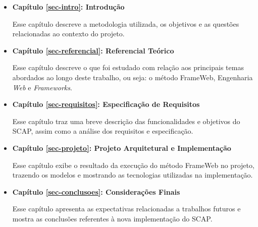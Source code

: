 \begin{itemize}

\item \textbf{Capítulo \ref{sec-intro}: Introdução}

Esse capítulo descreve a metodologia utilizada, os objetivos e as questões relacionadas ao contexto do projeto. 

\item \textbf{Capítulo \ref{sec-referencial}: Referencial Teórico}

Esse capítulo descreve o que foi estudado com relação aos principais temas abordados ao longo deste trabalho, ou seja: o método FrameWeb, Engenharia \textit{Web} e \textit{Frameworks}.

\item \textbf{Capítulo \ref{sec-requisitos}: Especificação de Requisitos}

Esse capítulo traz uma breve descrição das funcionalidades e objetivos do SCAP, assim como a análise dos requisitos e especificação.

\item \textbf{Capítulo \ref{sec-projeto}: Projeto Arquitetural e Implementação}

Esse capítulo exibe o resultado da execução do método FrameWeb no projeto, trazendo os modelos e mostrando as tecnologias utilizadas na implementação. 

\item \textbf{Capítulo \ref{sec-conclusoes}: Considerações Finais}

Esse capítulo apresenta as expectativas relacionadas a trabalhos futuros e mostra as conclusões referentes à nova implementação do SCAP.  

\end{itemize}

